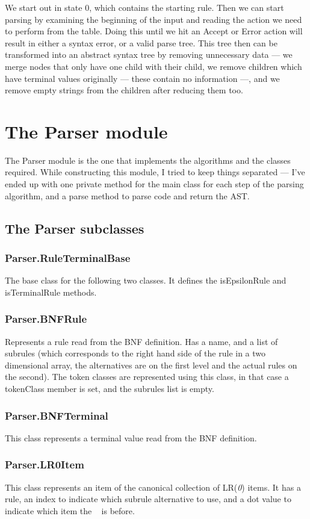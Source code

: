 We start out in state 0, which contains the starting rule. Then we can start parsing by examining the beginning of the input and reading the action we need to perform from the table. Doing this until we hit an Accept or Error action will result in either a syntax error, or a valid parse tree. This tree then can be transformed into an abstract syntax tree by removing unnecessary data --- we merge nodes that only have one child with their child, we remove children which have terminal values originally --- these contain no information ---, and we remove empty strings from the children after reducing them too.
\section{The Parser module}
The Parser module is the one that implements the algorithms and the classes required. While constructing this module, I tried to keep things separated --- I've ended up with one private method for the main class for each step of the parsing algorithm, and a parse method to parse code and return the AST.
\subsection{The Parser subclasses}
\subsubsection{Parser.RuleTerminalBase}
The base class for the following two classes. It defines the isEpsilonRule and isTerminalRule methods.
\subsubsection{Parser.BNFRule}
Represents a rule read from the BNF definition. Has a name, and a list of subrules (which corresponds to the right hand side of the rule in a two dimensional array, the alternatives are on the first level and the actual rules on the second). The token classes are represented using this class, in that case a tokenClass member is set, and the subrules list is empty.
\subsubsection{Parser.BNFTerminal}
This class represents a terminal value read from the BNF definition.
\subsubsection{Parser.LR0Item}
This class represents an item of the canonical collection of LR(\textit{0}) items. It has a rule, an index to indicate which subrule alternative to use, and a dot value to indicate which item the \textbullet ~ is before.
